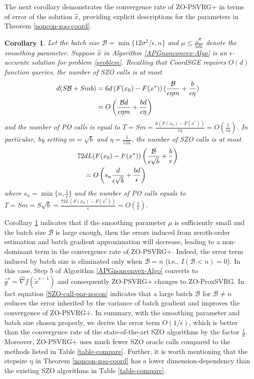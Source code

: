 \documentclass[iicol,sn-basic]{sn-jnl}
\theoremstyle{thmstyleone}%
\theoremstyle{thmstyletwo}%
\theoremstyle{thmstylethree}%
\newtheorem{corollary}[theorem]{Corollary}
\begin{document}
The next corollary demonstrates the convergence rate of ZO-PSVRG+ in terms of error of the solution $\hat{x}$, providing explicit descriptions for the parameters in Theorem \ref{noncon-zoo-coord}.
 \begin{corollary}\label{corr11}
Let the batch size $\mathcal{B} = \min\{12\sigma^2/\epsilon, n\}$ and $\mu \leq \frac{\sqrt{\epsilon}}{5{dL}}$ denote the smoothing parameter. Suppose $\hat{x}$ in Algorithm \ref{APGnonconvex-Algo} is an $\epsilon$-accurate solution for problem \eqref{problem}. Recalling that CoordSGE requires $O(d)$ function queries, the number of SZO calls is at most 
\begin{align}
d(S\mathcal{B}+Smb) &= 6d \left(F(x_0) - F({x}^*)\right) (\frac{\mathcal{B}}{\epsilon\eta m}+\frac{b}{\epsilon\eta})\notag\\
& = O\left(\frac{\mathcal{B}d}{\epsilon\eta m}+\frac{bd}{\epsilon\eta}\right)\label{SZO-call-nocon}
\end{align}
and the number of PO calls is equal to $T = Sm = \frac{6\left(F(x_0) - F({x}^*)\right)}{\epsilon\eta} = O\left(\frac{1}{\epsilon\eta}\right)$. In particular, by setting $m=\sqrt{b}$ and $\eta = \frac{1}{12L}$, the number of SZO calls is at most 
\begin{align}
72&d L (F(x_0)-F(x^*))\left(\frac{\mathcal{B}}{\epsilon\sqrt{b}}+\frac{b}{\epsilon}\right)\notag\\
& = O\left(s_n\frac{d}{\epsilon \sqrt{b}}+\frac{bd}{\epsilon}\right)\label{SZO-call-par-nocon}
\end{align}
where $s_n = \min\{n,\frac{1}{\epsilon}\}$ and the number of PO calls equals to $T = Sm = S\sqrt{b} = \frac{72 L \left(F(x_0) - F({x}^*)\right)}{\epsilon} = O\left(\frac{1}{\epsilon}\right)$. 
\end{corollary}
Corollary \ref{corr11} indicates that if the smoothing parameter $\mu$ is sufficiently small and the batch size $\mathcal{B}$ is large enough, then the errors induced from zeroth-order estimation and batch gradient approximation will decrease, leading to a non-dominant term in the convergence rate of ZO-PSVRG+. Indeed, the error term induced by batch size  is eliminated only when $\mathcal{B} = n$  (i.e., $I(\mathcal{B} < n) = 0$). 
In
this case, Step 5 of Algorithm \ref{APGnonconvex-Algo} converts to $\hat{g}^s = \hat{\nabla} f(\tilde{x}^{s-1})$ and consequently ZO-PSVRG+ changes to ZO-ProxSVRG. In fact equation \eqref{SZO-call-par-nocon} indicates that a large batch $\mathcal{B}$  for $\mathcal{B} \neq n$ reduces the error inherited by the variance of batch gradient and improves the convergence of ZO-PSVRG+. In summary, with the smoothing parameter and batch size chosen properly, we derive the error term $O(1/\epsilon)$, which is better than the convergence rate of the state-of-the-art SZO algorithms by the factor $\frac{1}{d}$. Moreover, ZO-PSVRG+ uses much fewer SZO oracle calls compared to the methods listed in Table \ref{table-compare}. Further, it is worth mentioning that the stepsize $\eta$ in Theorem \ref{noncon-zoo-coord} has a lower dimension-dependency than the existing SZO algorithms in Table \ref{table-compare}. 
\end{document}
